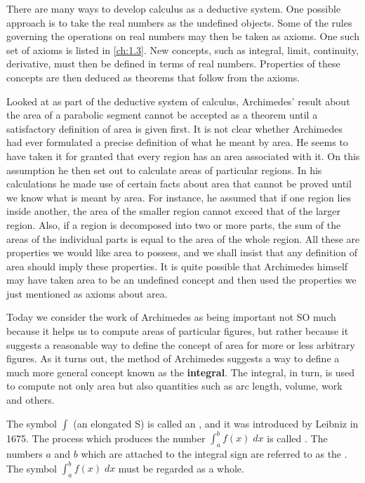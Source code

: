 \begin{note}
  There are many ways to develop calculus as a deductive system.
  One possible approach is to take the real numbers as the undefined objects.
  Some of the rules governing the operations on real numbers may then be taken as axioms.
  One such set of axioms is listed in \cref{ch:1.3}.
  New concepts, such as integral, limit, continuity, derivative, must then be defined in terms of real numbers.
  Properties of these concepts are then deduced as theorems that follow from the axioms.

  Looked at as part of the deductive system of calculus, Archimedes' result about the area of a parabolic segment cannot be accepted as a theorem until a satisfactory definition of area is given first.
  It is not clear whether Archimedes had ever formulated a precise definition of what he meant by area.
  He seems to have taken it for granted that every region has an area associated with it.
  On this assumption he then set out to calculate areas of particular regions.
  In his calculations he made use of certain facts about area that cannot be proved until we know what is meant by area.
  For instance, he assumed that if one region lies inside another, the area of the smaller region cannot exceed that of the larger region.
  Also, if a region is decomposed into two or more parts, the sum of the areas of the individual parts is equal to the area of the whole region.
  All these are properties we would like area to possess, and we shall insist that any definition of area should imply these properties.
  It is quite possible that Archimedes himself may have taken area to be an undefined concept and then used the properties we just mentioned as axioms about area.

  Today we consider the work of Archimedes as being important not SO much because it helps us to compute areas of particular figures, but rather because it suggests a reasonable way to define the concept of area for more or less arbitrary figures.
  As it turns out, the method of Archimedes suggests a way to define a much more general concept known as the \textbf{integral}.
  The integral, in turn, is used to compute not only area but also quantities such as arc length, volume, work and others.

  The symbol \(\int\) (an elongated S) is called an \textbf{}, and it was introduced by Leibniz in 1675.
  The process which produces the number \(\int_a^b f(x) \; dx\) is called \textbf{}.
  The numbers \(a\) and \(b\) which are attached to the integral sign are referred to as the \textbf{}.
  The symbol \(\int_a^b f(x) \; dx\) must be regarded as a whole.


\end{note}
